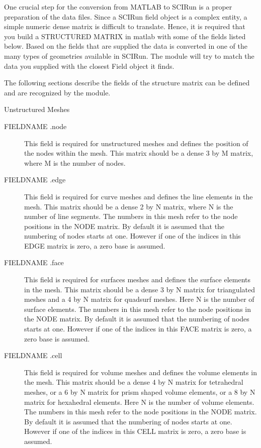 	One crucial step for the conversion from MATLAB to SCIRun is a proper preparation of the data files. Since a SCIRun field object is a complex
	entity, a simple numeric dense matrix is difficult to translate. Hence, it is required that you build a STRUCTURED MATRIX in matlab with some
	of the fields listed below. Based on the fields that are supplied the data is converted in one of the many types of geometries available in SCIRun.
	The module will try to match the data you supplied with the closest Field object it finds. 
	




	The following sections describe the fields of the structure matrix can be defined and are recognized by the module.
	

Unstructured Meshes 
\begin{description}

\item[ FIELDNAME .node ]  
			This field is required for unstructured meshes and defines the position of the nodes within the mesh. 
			This matrix should be a dense 3 by M matrix, where M is the number of nodes.
			
\item[ FIELDNAME .edge ]  
			This field is required for curve meshes and defines the line elements in the mesh. This matrix should be
			a dense 2 by N matrix, where N is the number of line segments. The numbers in this mesh refer to the node
			positions in the NODE matrix. By default it is assumed that the numbering of nodes starts at one. However if
			one of the indices in this EDGE matrix is zero, a zero base is assumed. 
			
\item[ FIELDNAME .face ]  
			This field is required for surfaces meshes and defines the surface elements in the mesh. This matrix should be
			a dense 3 by N matrix for triangulated meshes and a 4 by N matrix for quadsurf meshes. Here N is the number of 
			surface elements. The numbers in this mesh refer to the node
			positions in the NODE matrix. By default it is assumed that the numbering of nodes starts at one. However if
			one of the indices in this FACE matrix is zero, a zero base is assumed.
			
\item[ FIELDNAME .cell ]  
			This field is required for volume meshes and defines the volume elements in the mesh. This matrix should be
			a dense 4 by N matrix for tetrahedral meshes, or a 6 by N matrix for prism shaped volume elements, or a 8 by N matrix
			for hexahedral elements. Here N is the number of volume elements. The numbers in this mesh refer to the node
			positions in the NODE matrix. By default it is assumed that the numbering of nodes starts at one. However if
			one of the indices in this CELL matrix is zero, a zero base is assumed.
			
\end{description}
